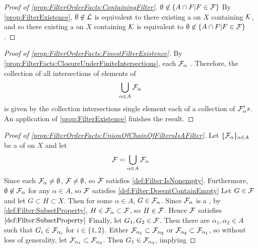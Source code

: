 \begin{prop}
\begin{proof}[Proof of \ref{prop:FilterOrderFacts:ContainingFilter}]
        $\emptyset \not \in \{A \cap F | F \in \mathcal{F}\}$
        By
        \ref{prop:FilterExistence}, 
        $\emptyset \not \in \mathcal{L}$ is equivalent to 
        there existing a \Filter on $X$ containing $\mathcal{K}$, 
        and so there existing a \Filter on $X$ containing $\mathcal{K}$ 
        is equivalent to 
        $\emptyset \not \in \{A \cap F | F \in \mathcal{F}\}$. 
    \end{proof}
    \begin{proof}[Proof of \ref{prop:FilterOrderFacts:FinestFilterExistence}]
        By 
        \ref{prop:FilterFacts:ClosureUnderFiniteIntersections}, 
        each $\mathcal{F}_\alpha$ 
        \ClosedUnderFiniteIntersections.
        Therefore, the collection of all 
        \Finite intersections of elements of 
        \begin{equation*}
            \bigcup\limits_{\alpha \in A} \mathcal{F}_\alpha
        \end{equation*}
        is given by the collection intersections single 
        element each of a \Finite collection of $\mathcal{F}_\alpha's$. 
        An application of \ref{prop:FilterExistence} finishes the result. 
    \end{proof}
    \begin{proof}[Proof of \ref{prop:FilterOrderFacts:UnionOfChainOfFiltersIsAFilter}]
        Let $\{\mathcal{F}_\alpha\}_{\alpha \in A}$ be a \Chain of \Filters on $X$ and let 
        \begin{equation*}
            \mathcal{F} = \bigcup\limits_{\alpha \in A} \mathcal{F}_\alpha
        \end{equation*}
        Since each $\mathcal{F}_\alpha \neq \emptyset$, $\mathcal{F} \neq \emptyset$, so $\mathcal{F}$ satisfies 
        \ref{def:Filter:IsNonempty}. 
        Furthermore, $\emptyset \not \in \mathcal{F}_\alpha$ for any $\alpha \in A$, so $\mathcal{F}$ satisfies
        \ref{def:Filter:DoesntContainEmpty}
        Let $G \in \mathcal{F}$ and let $G \subset H \subset X$. 
        Then for some $\alpha \in A$, $G \in \mathcal{F}_\alpha$. Since $\mathcal{F}_\alpha$ is a 
        \Filter, 
        by \ref{def:Filter:SubsetProperty}, $H \in \mathcal{F}_\alpha \subset \mathcal{F}$, so $H \in \mathcal{F}$. 
        Hence $\mathcal{F}$ satisfies $\ref{def:Filter:SubsetProperty}$
        Finally, let $G_1,G_2 \in \mathcal{F}$. 
        Then there are $\alpha_1,\alpha_2 \in A$ such that 
        $G_i \in \mathcal{F}_{\alpha_i}$ for $i \in \{1,2\}$. 
        Either $\mathcal{F}_{\alpha_1} \subset \mathcal{F}_{\alpha_2}$ or 
        $\mathcal{F}_{\alpha_2} \subset \mathcal{F}_{\alpha_1}$, so without loss of generality, 
        let $\mathcal{F}_{\alpha_1} \subset \mathcal{F}_{\alpha_2}$. 
        Then $G_1 \in \mathcal{F}_{\alpha_2}$, implying 

\end{proof}
\end{prop}
